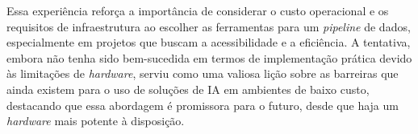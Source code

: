 Essa experiência reforça a importância de considerar o custo operacional e os requisitos de infraestrutura ao escolher as ferramentas para um \textit{pipeline} de dados, especialmente em projetos que buscam a acessibilidade e a eficiência. A tentativa, embora não tenha sido bem-sucedida em termos de implementação prática devido às limitações de \textit{hardware}, serviu como uma valiosa lição sobre as barreiras que ainda existem para o uso de soluções de IA em ambientes de baixo custo, destacando que essa abordagem é promissora para o futuro, desde que haja um \textit{hardware} mais potente à disposição.